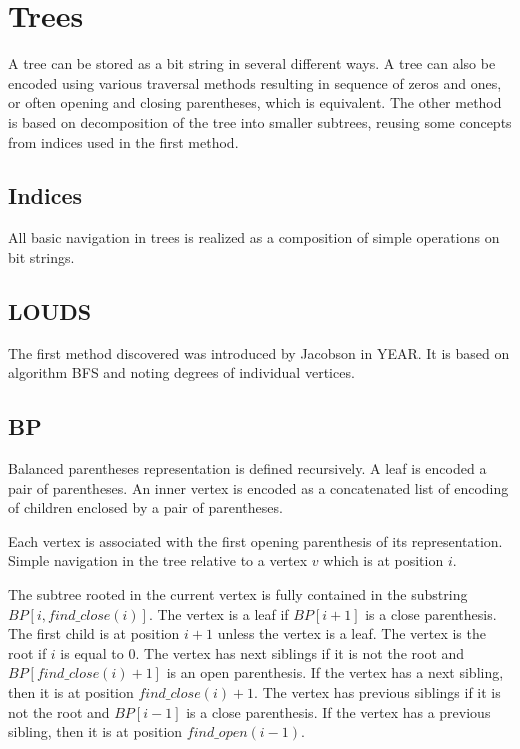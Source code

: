 \chapter{Trees}

A tree can be stored as a bit string in several different ways.
A tree can also be encoded using various traversal methods resulting in sequence of zeros and ones, or often opening and closing parentheses, which is equivalent.
The other method is based on decomposition of the tree into smaller subtrees, reusing some concepts from indices used in the first method.

\section{Indices}

All basic navigation in trees is realized as a composition of simple operations on bit strings.





\section{LOUDS}

The first method discovered was introduced by Jacobson in YEAR.
It is based on algorithm BFS and noting degrees of individual vertices.


\section{BP}

Balanced parentheses representation is defined recursively.
A leaf is encoded a pair of parentheses.
An inner vertex is encoded as a concatenated list of encoding of children enclosed by a pair of parentheses.


Each vertex is associated with the first opening parenthesis of its representation.
Simple navigation in the tree relative to a vertex $v$ which is at position $i$.

The subtree rooted in the current vertex is fully contained in the substring $BP[i, find\_close(i)]$.
The vertex is a leaf if $BP[i+1]$ is a close parenthesis.
The first child is at position $i+1$ unless the vertex is a leaf.
The vertex is the root if $i$ is equal to $0$.
The vertex has next siblings if it is not the root and $BP[find\_close(i) + 1]$ is an open parenthesis.
If the vertex has a next sibling, then it is at position $find\_close(i) + 1$.
The vertex has previous siblings if it is not the root and $BP[i-1]$ is a close parenthesis.
If the vertex has a previous sibling, then it is at position $find\_open(i-1)$.

